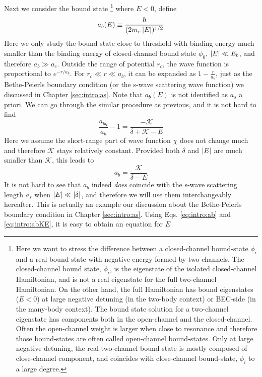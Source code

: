 Next we consider the bound state \footnote{Here we want to stress the difference between a closed-channel bound-state $\phi_{i}$ and a real bound state with negative energy formed by two channels.   The closed-channel bound state, $\phi_{i}$, is the eigenstate of the  isolated closed-channel Hamiltonian, and is not a real eigenstate for the full two-channel Hamiltonian.  On the other hand, the full  Hamiltonian has bound eigenstates ($E<0$) at large negative detuning (in the two-body context) or BEC-side (in the many-body context).  The bound state solution for a two-channel eigenstate has components both in the open-channel and the closed-channel.  Often the open-channel weight is larger when close to resonance and therefore those bound-states are often called open-channel bound-states.  Only at large negative detuning, the real two-channel bound state is mostly composed of close-channel component, and coincides with close-channel bound-state, $\phi_{i}$ to a large degree.}
where $E<0$, define
\begin{equation}\label{eq:intro:ab}
a_{b}(E)\equiv\frac{\hbar}{(2m_{r}\left\lvert{E}\right\rvert)^{1/2}}
\end{equation}
 Here we only study the bound state close to threshold with binding energy much smaller than the binding energy of closed-channel bound state $\phi_{0}$, $\left\lvert{E}\right\rvert\ll{}E_{b}$, and therefore $a_{b}\gg{a_{c}}$.  Outside the range of potential $r_{c}$,  the wave function is proportional to $e^{-r/a_{b}}$. For $r_{c}\ll{}r\ll{}a_{b}$, it can be expanded as  $1-\frac{r}{a_{b}}$, just as the Bethe-Peierls boundary condition (or the s-wave scattering wave function) we discussed in Chapter \ref{sec:intro:as}.  Note that $a_{b}(E)$ is not identified as $a_{s}$ a priori.  We can go through the similar procedure as previous, and it is not hard to find
\begin{equation}
\frac{a_{bg}}{a_{b}}-1=\frac{-\mathcal{K}}{\delta+\mathcal{K}-E}
\end{equation}
Here we assume the short-range part of wave function $\chi$ does not change much and therefore $\mathcal{K}$ stays relatively constant.  Provided both $\delta$ and $\left\lvert{E}\right\rvert$ are much smaller than $\mathcal{K}$, this leads to 
\begin{equation}\label{eq:intro:abKE}
a_{b}=\frac{\mathcal{K}}{\delta-E}
\end{equation}
It is not hard to see that $a_{b}$ indeed \emph{does} coincide with the s-wave scattering length $a_{s}$ when $\left\lvert{E}\right\rvert\ll\left\lvert{\delta}\right\rvert$, and therefore we will use them interchangeably hereafter. This is actually an example our discussion about the Bethe-Peierls boundary condition in Chapter \ref{sec:intro:as}.  Using Eqs. \ref{eq:intro:ab} and \ref{eq:intro:abKE}, it is easy to obtain an equation for $E$
